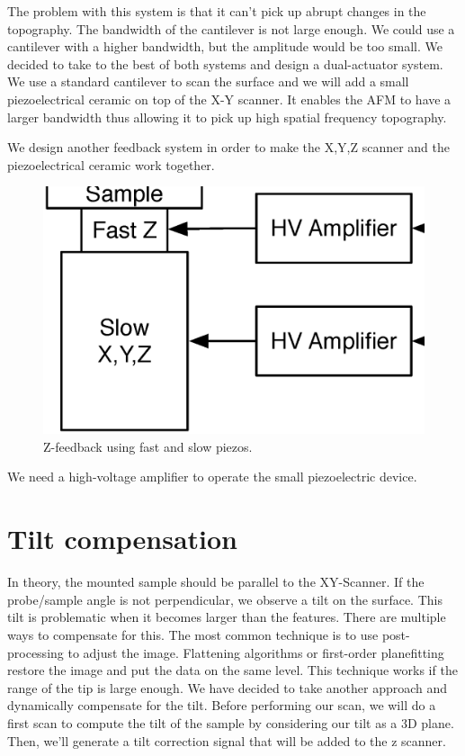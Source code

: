 The problem with this system is that it can't pick up abrupt changes in the topography.\cite{jeong:093706} The bandwidth of the cantilever is not large enough. We could use a cantilever with a higher bandwidth, but the amplitude would be too small. We decided to take to the best of both systems and design a dual-actuator system. We use a standard cantilever to scan the surface and we will add a small piezoelectrical ceramic on top of the X-Y scanner. It enables the AFM to have a larger bandwidth thus allowing it to pick up high spatial frequency topography. 

We design another feedback system in order to make the X,Y,Z scanner and the piezoelectrical ceramic work together. \cite{el2004dual}

\begin{figure}[H]
  \centering
  \includegraphics[scale=0.3]{images/doublePID.eps}
    \caption{Z-feedback using fast and slow piezos.}
  \label{DoublePid}
\end{figure}

We need a high-voltage amplifier to operate the small piezoelectric device. 

\section{Tilt compensation}
\label{sec:tiltcompensation}

In theory, the mounted sample should be parallel to the XY-Scanner. If the probe/sample angle is not perpendicular, we observe a tilt on the surface. This tilt is problematic when it becomes larger than the features. There are multiple ways to compensate for this. The most common technique is to use post-processing to adjust the image. Flattening algorithms or first-order planefitting restore the image and put the data on the same level. This technique works if the range of the tip is large enough. We have decided to take another approach and dynamically compensate for the tilt. Before performing our scan, we will do a first scan to compute the tilt of the sample by considering our tilt as a 3D plane. Then, we'll generate a tilt correction signal that will be added to the z scanner.


